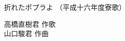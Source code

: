 \documentclass[10pt,b5j]{tarticle} %
\begin{document}
\begin{minipage}[c]{0.7\hsize} %
    \begin{center}
        {\LARGE
            折れたポプラよ %
        }
        {\small 
            （平成十六年度寮歌） %
        }
    \end{center}
\end{minipage}
\begin{minipage}[c]{0.3\hsize} %
    \begin{flushright} %
        高橋直樹君 作歌\\山口駿君 作曲 %
    \end{flushright}
\end{minipage}
\end{document}
